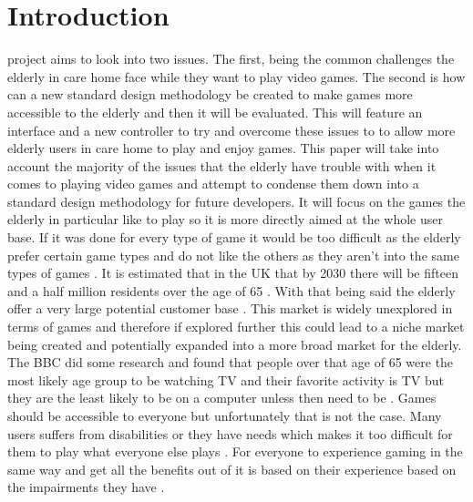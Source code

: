 \documentclass[journal]{IEEEtran}
\begin{document}
\section{Introduction}
% 
% 
% 
% 
 project aims to look into two issues. The first, being the common challenges the elderly in care home face while they want to play video games. The second is how can a new standard design methodology be created to make games more accessible to the elderly and then it will be evaluated. This will feature an interface and a new controller to try and overcome these issues to to allow more elderly users in care home to play and enjoy games. 
\newline
This paper will take into account the majority of the issues that the elderly have trouble with when it comes to playing video games and attempt to condense them down into a standard design methodology for future developers. It will focus on the games the elderly in particular like to play so it is more directly aimed at the whole user base. If it was done for every type of game it would be too difficult as the elderly prefer certain game types \cite{whitcomb_computer_1990} and do not like the others as they aren't into the same types of games \cite{whitcomb_computer_1990}.
\newline 
It is estimated that in the UK that by 2030 there will be fifteen and a half million  residents over the age of 65 \cite{noauthor_ageing_nodate}. With that being said the elderly offer a very large potential customer base \cite{ijsselsteijn_digital_2007}. This market is widely unexplored in terms of games and therefore if explored further this could lead to a niche market being created and potentially expanded into a more broad market for the elderly. The BBC did some research and found that people over that age of 65 were the most likely age group to be watching TV and their favorite activity is TV but they are the least likely to be on a computer unless then need to be \cite{ijsselsteijn_digital_2007}. Games should be accessible to everyone but unfortunately that is not the case. Many users suffers from disabilities or they have needs which makes it too difficult for them to play what everyone else plays \cite{torrente_introducing_2011}. For everyone to experience gaming in the same way and get all the benefits out of it is based on their experience based on the impairments they have \cite{gerling_long-term_2015}.
\end{document}
